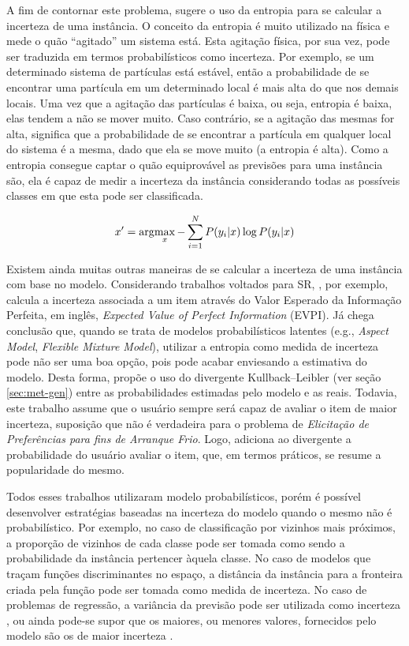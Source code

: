 A fim de contornar este problema, \citep{settles.tr09} sugere o uso da entropia para se calcular a incerteza de uma instância. O conceito da entropia é muito utilizado na física e mede o quão ``agitado'' um sistema está. Esta agitação física, por sua vez, pode ser traduzida em termos probabilísticos como incerteza. Por exemplo, se um determinado sistema de partículas está estável, então a probabilidade de se encontrar uma partícula em um determinado local é mais alta do que nos demais locais. Uma vez que a agitação das partículas é baixa, ou seja, entropia é baixa, elas tendem a não se mover muito. Caso contrário, se a agitação das mesmas for alta, significa que a probabilidade de se encontrar a partícula em qualquer local do sistema é a mesma, dado que ela se move muito (a entropia é alta). Como a entropia consegue captar o quão equiprovável as previsões para uma instância são, ela é capaz de medir a incerteza da instância considerando todas as possíveis classes em que esta pode ser classificada.

\begin{equation}
x' = \arg\!\max_x -\sum_{i=1}^{N} P(y_i|x) \log P(y_i|x)
\end{equation}

Existem ainda muitas outras maneiras de se calcular a incerteza de uma instância com base no modelo. Considerando trabalhos voltados para SR, \citep{Boutilier:2002:ACF:2100584.2100596}, por exemplo, calcula a incerteza associada a um item através do Valor Esperado da Informação Perfeita, em inglês, \textit{Expected Value of Perfect Information} (EVPI). Já \citep{Jin:2004:BAT:1036843.1036877} chega conclusão que, quando se trata de modelos probabilísticos latentes (e.g., \textit{Aspect Model}, \textit{Flexible Mixture Model}), utilizar a entropia como medida de incerteza pode não ser uma boa opção, pois pode acabar enviesando a estimativa do modelo. Desta forma, \citep{Jin:2004:BAT:1036843.1036877} propõe o uso do divergente Kullback–Leibler (ver seção \ref{sec:met-gen}) entre as probabilidades estimadas pelo modelo e as reais. Todavia, este trabalho assume que o usuário sempre será capaz de avaliar o item de maior incerteza, suposição que não é verdadeira para o problema de \textit{Elicitação de Preferências para fins de Arranque Frio}. Logo, \citep{Harpale:2008:PAL:1390334.1390352} adiciona ao divergente a probabilidade do usuário avaliar o item, que, em termos práticos, se resume a popularidade do mesmo.

Todos esses trabalhos utilizaram modelo probabilísticos, porém é possível desenvolver estratégias baseadas na incerteza do modelo quando o mesmo não é probabilístico. Por exemplo, no caso de classificação por vizinhos mais próximos, a proporção de vizinhos de cada classe pode ser tomada como sendo a probabilidade da instância pertencer àquela classe. No caso de modelos que traçam funções discriminantes no espaço, a distância da instância para a fronteira criada pela função pode ser tomada como medida de incerteza. No caso de problemas de regressão, a variância da previsão pode ser utilizada como incerteza \citep{settles.tr09}, ou ainda pode-se supor que os maiores, ou menores valores, fornecidos pelo modelo são os de maior incerteza \citep{Elahi:2014:ALS:2542182.2542195}. 

